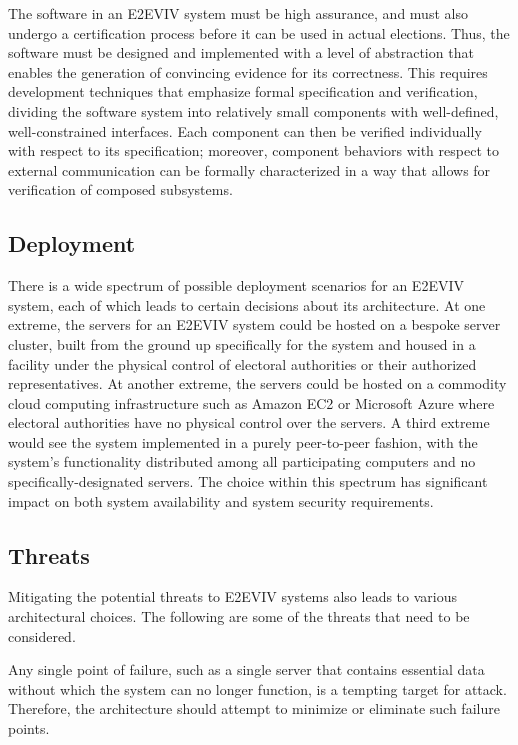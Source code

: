 The software in an E2EVIV system must be high assurance, and must also
undergo a certification process before it can be used in actual
elections. Thus, the software must be designed and implemented with a
level of abstraction that enables the generation of convincing
evidence for its correctness. This requires development techniques
that emphasize formal specification and verification, dividing the
software system into relatively small components with well-defined,
well-constrained interfaces. Each component can then be verified
individually with respect to its specification; moreover, component
behaviors with respect to external communication can be formally
characterized in a way that allows for verification of composed
subsystems.

\subsection{Deployment}

There is a wide spectrum of possible deployment scenarios for an
E2EVIV system, each of which leads to certain decisions about its
architecture. At one extreme, the servers for an E2EVIV system could
be hosted on a bespoke server cluster, built from the ground up
specifically for the system and housed in a facility under the
physical control of electoral authorities or their authorized
representatives. At another extreme, the servers could be hosted on a
commodity cloud computing infrastructure such as Amazon EC2 or
Microsoft Azure where electoral authorities have no physical control
over the servers. A third extreme would see the system implemented in
a purely peer-to-peer fashion, with the system's functionality
distributed among all participating computers and no
specifically-designated servers. The choice within this spectrum has
significant impact on both system availability and system security
requirements.


\subsection{Threats}

Mitigating the potential threats to E2EVIV systems also leads to
various architectural choices. The following are some of the threats
that need to be considered. 

Any single point of failure, such as a single server that contains
essential data without which the system can no longer function, is a
tempting target for attack. Therefore, the architecture should attempt
to minimize or eliminate such failure points.

